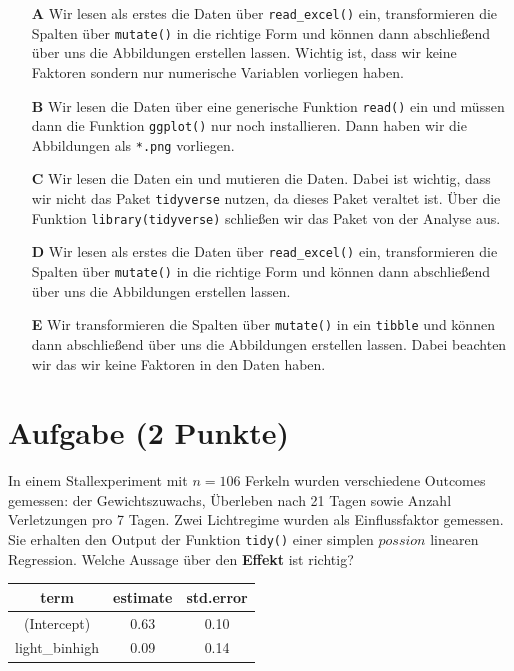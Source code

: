 \documentclass[a4paper, 10pt]{scrartcl}\usepackage[]{graphicx}\usepackage[]{color}
\begin{document}
\begin{enumerate}
\item [\textbf{A} \msquare] Wir lesen als erstes die Daten über \texttt{read\_excel()} ein, transformieren die Spalten über \texttt{mutate()} in die richtige Form und können dann abschließend über  uns die Abbildungen erstellen lassen. Wichtig ist, dass wir keine Faktoren sondern nur numerische Variablen vorliegen haben.
\item [\textbf{B} \msquare] Wir lesen die Daten über eine generische Funktion \texttt{read()} ein und müssen dann die Funktion \texttt{ggplot()} nur noch installieren. Dann haben wir die Abbildungen als \texttt{*.png} vorliegen.
\item [\textbf{C} \msquare] Wir lesen die Daten ein und mutieren die Daten. Dabei ist wichtig, dass wir nicht das Paket \texttt{tidyverse} nutzen, da dieses Paket veraltet ist. Über die Funktion \texttt{library(tidyverse)} schließen wir das Paket von der Analyse aus.
\item [\textbf{D} \msquare] Wir lesen als erstes die Daten über \texttt{read\_excel()} ein, transformieren die Spalten über \texttt{mutate()} in die richtige Form und können dann abschließend über  uns die Abbildungen erstellen lassen.
\item [\textbf{E} \msquare] Wir transformieren die Spalten über \texttt{mutate()} in ein \texttt{tibble} und können dann abschließend über  uns die Abbildungen erstellen lassen. Dabei beachten wir das wir keine Faktoren in den Daten haben.
\end{enumerate}

\section{Aufgabe \hfill (2 Punkte)}



In einem Stallexperiment mit $n = 106$ Ferkeln wurden verschiedene
Outcomes gemessen: der Gewichtszuwachs, {\"U}berleben nach 21 Tagen sowie
Anzahl Verletzungen pro 7 Tagen. Zwei Lichtregime wurden als
Einflussfaktor gemessen. Sie erhalten den \Rlogo Output der Funktion
\texttt{tidy()} einer simplen $possion$ linearen
Regression. Welche Aussage {\"u}ber den \textbf{Effekt} ist richtig?

\begin{table}[!h]
\centering
\begin{tabular}{ccc}
\toprule
term & estimate & std.error\\
\midrule
(Intercept) & 0.63 & 0.10\\
light\_binhigh & 0.09 & 0.14\\
\bottomrule
\end{tabular}
\end{table}
\end{document}
